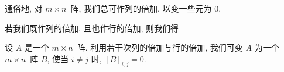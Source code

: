 \documentclass[../libro.tex]{subfiles}
\begin{document}




通俗地, 对 \(m \times n\)~阵,
我们总可作列的倍加, 以变一些元为 \(0\).

若我们既作列的倍加, 且也作行的倍加, 则我们得

\begin{theorem}
    设 \(A\) 是一个 \(m \times n\)~阵.
    利用若干次列的倍加与行的倍加,
    我们可变 \(A\) 为一个 \(m \times n\)~阵 \(B\),
    使当 \(i \neq j\) 时, \([B]_{i,j} = 0\).
\end{theorem}
\end{document}
